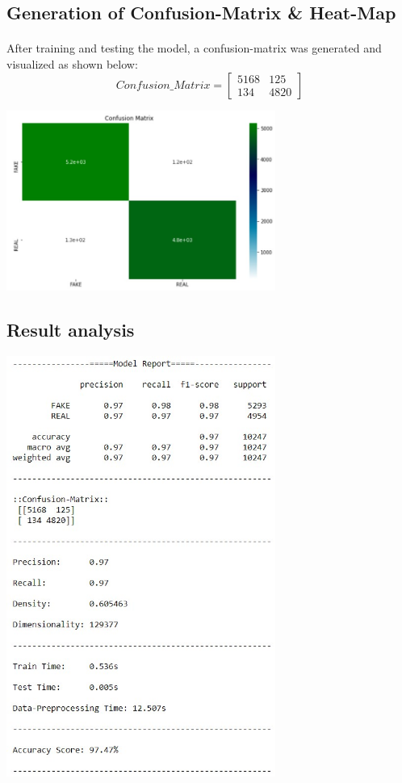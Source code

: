 \documentclass[11.5pt]{article}
\begin{document}
\begin{multicols}{2}
\subsection{Generation of Confusion-Matrix \& Heat-Map}
\paragraph{}
After training and testing the model, a confusion-matrix was generated and visualized as shown below:
\begin{equation}
    Confusion\_Matrix = 
    \begin{bmatrix}
        5168 & 125\\
        134 & 4820
    \end{bmatrix}
\end{equation}
\begin{center}
    \centering
    \qquad
    \includegraphics[width=8.8cm]{report4.jpg}
\end{center}

\subsection{Result analysis}
\begin{center}
    \centering
    \qquad
    \includegraphics[width=8.8cm]{report1.jpg}
\end{center}


\end{multicols}
\end{document}
